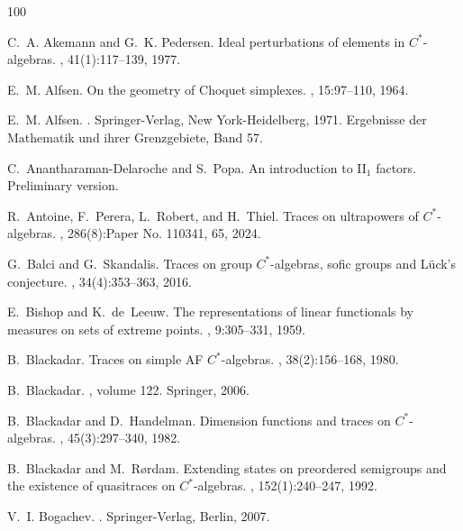 \documentclass[a4paper,11pt]{amsart}
\theoremstyle{definition}
\numberwithin{equation}{section}
\numberwithin{theorem}{section}
\begin{document}
\begin{thebibliography}{100}

C.~A. Akemann and G.~K. Pedersen.
\newblock Ideal perturbations of elements in {$C^*$}-algebras.
, 41(1):117--139, 1977.

E.~M. Alfsen.
\newblock On the geometry of {C}hoquet simplexes.
, 15:97--110, 1964.

E.~M. Alfsen.
.
\newblock Springer-Verlag, New York-Heidelberg, 1971.
\newblock Ergebnisse der Mathematik und ihrer Grenz\-gebiete, Band 57.

C.~Anantharaman-Delaroche and S.~Popa.
\newblock An introduction to {II$_1$} factors.
\newblock Preliminary version.

R.~Antoine, F.~Perera, L.~Robert, and H.~Thiel.
\newblock Traces on ultrapowers of {$C^*$}-algebras.
, 286(8):Paper No. 110341, 65, 2024.

G.~Balci and G.~Skandalis.
\newblock Traces on group {$C^*$}-algebras, sofic groups and {L}\"{u}ck's
  conjecture.
, 34(4):353--363, 2016.

E.~Bishop and K.~de~Leeuw.
\newblock The representations of linear functionals by measures on sets of
  extreme points.
, 9:305--331, 1959.

B.~Blackadar.
\newblock Traces on simple {AF} {$C^*$}-algebras.
, 38(2):156--168, 1980.

B.~Blackadar.
, volume 122.
\newblock Springer, 2006.

B.~Blackadar and D.~Handelman.
\newblock Dimension functions and traces on {$C^{\ast} $}-algebras.
, 45(3):297--340, 1982.

B.~Blackadar and M.~R{\o}rdam.
\newblock Extending states on preordered semigroups and the existence of
  quasitraces on {$C^*$}-algebras.
, 152(1):240--247, 1992.

V.~I. Bogachev.
.
\newblock Springer-Verlag, Berlin, 2007.


\end{thebibliography}
\end{document}
